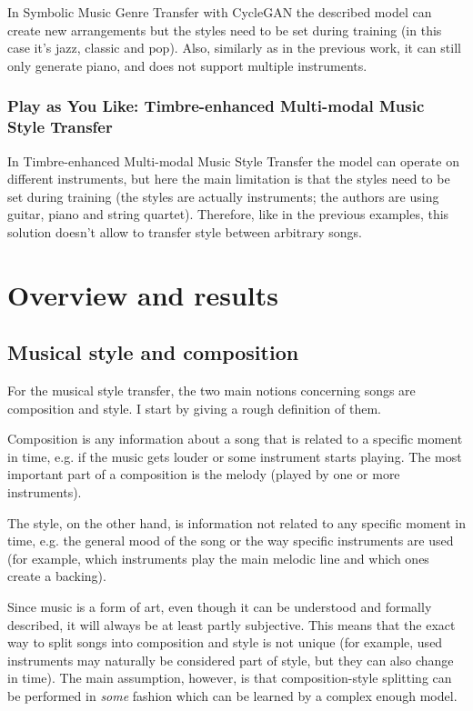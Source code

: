 \documentclass[en]{pracamgr}
\begin{document}
In Symbolic Music Genre Transfer with CycleGAN \cite{cyclegan} the described model can create new arrangements but the styles need to be set during training (in this case it's jazz, classic and pop).
Also, similarly as in the previous work, it can still only generate piano, and does not support multiple instruments.

\subsection{Play as You Like: Timbre-enhanced Multi-modal Music Style Transfer}

In Timbre-enhanced Multi-modal Music Style Transfer \cite{multimodal} the model can operate on different instruments, but here the main limitation is that the styles need to be set during training (the styles are actually instruments; the authors are using guitar, piano and string quartet).
Therefore, like in the previous examples, this solution doesn't allow to transfer style between arbitrary songs.

\chapter{Overview and results}

\section{Musical style and composition}

For the musical style transfer, the two main notions concerning songs are composition and style.
I start by giving a rough definition of them.

Composition is any information about a song that is related to a specific moment in time, e.g. if the music gets louder or some instrument starts playing.
The most important part of a composition is the melody (played by one or more instruments).

The style, on the other hand, is information not related to any specific moment in time, e.g. the general mood of the song or the way specific instruments are used (for example, which instruments play the main melodic line and which ones create a backing).

Since music is a form of art, even though it can be understood and formally described, it will always be at least partly subjective.
This means that the exact way to split songs into composition and style is not unique (for example, used instruments may naturally be considered part of style, but they can also change in time).
The main assumption, however, is that composition-style splitting can be performed in \emph{some} fashion which can be learned by a complex enough model.
\end{document}
